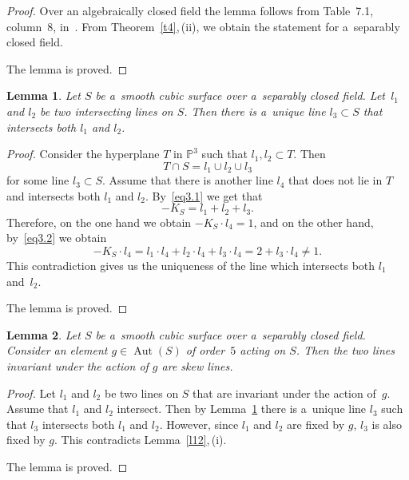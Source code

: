 \documentclass{amsart}
\numberwithin{equation}{section}
\theoremstyle{plain}
\newtheorem{lemma}{Lemma}
\theoremstyle{definition}
\theoremstyle{remark}
\begin{document}
\begin{proof}
Over an algebraically closed field the lemma follows from Table~7.1, co\mbox{lumn~8,} in~\cite{1}. From Theorem~\ref{t4},\,(ii), we obtain the statement for a~separably closed field.

The lemma is proved.
\end{proof}

\begin{lemma}
\label{l13}
Let $S$ be a~smooth cubic surface over a~separably closed field. Let~$l_1$ and $l_2$ be two intersecting lines on $S$. Then there is a~unique line $l_3 \subset S$ that intersects both $l_1$ and $l_2$.
\end{lemma}

\begin{proof}
Consider the hyperplane $T$ in $\mathbb{P}^3$ such that $l_1,l_2 \subset T$. Then
\begin{equation}
\label{eq3.1}
T \cap S=l_1 \cup l_2 \cup l_3
\end{equation}
for some line $l_3 \subset S$. Assume that there is another line $l_4$ that does not lie in $T$ and intersects both $l_1$ and $l_2$. By~\eqref{eq3.1} we get that
\begin{equation}
\label{eq3.2}
-K_S=l_1+l_2+l_3.
\end{equation}
Therefore, on the one hand we obtain $-K_S \cdot l_4=1$, and on the other hand, by~\eqref{eq3.2} we obtain
$$
-K_S \cdot l_4=l_1 \cdot l_4+l_2 \cdot l_4+l_3 \cdot l_4=2+l_3 \cdot l_4 \neq 1.
$$
This contradiction gives us the uniqueness of the line which intersects both $l_1$ and~$l_2$.

The lemma is proved.
\end{proof}

\begin{lemma}
\label{l14}
Let $S$ be a~smooth cubic surface over a~separably closed field. Consider an element $g \in \operatorname{Aut}(S)$ of order~$5$ acting on $S$. Then the two lines invariant under the action of $g$ are skew lines.
\end{lemma}

\begin{proof}
Let $l_1$ and $l_2$ be two lines on $S$ that are invariant under the action of~$g$. Assume that $l_1$ and $l_2$ intersect. Then by Lemma~\ref{l13} there is a~unique line $l_3$ such that $l_3$ intersects both $l_1$ and $l_2$. However, since $l_1$ and $l_2$ are fixed by $g$, $l_3$ is also fixed by $g$. This contradicts Lemma~\ref{l12},\,(i).

The lemma is proved.
\end{proof}
\end{document}
